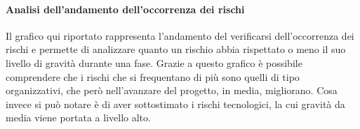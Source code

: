 \paragraph{Analisi dell'andamento dell'occorrenza dei rischi}
Il grafico qui riportato rappresenta l'andamento del verificarsi dell'occorrenza dei rischi e permette di analizzare quanto un rischio abbia rispettato o meno il suo livello di gravità durante una fase.
Grazie a questo grafico è possibile comprendere che i rischi che si frequentano di più sono quelli di tipo organizzativi, che però nell'avanzare del progetto, in media, migliorano.
Cosa invece si può notare è di aver sottostimato i rischi tecnologici, la cui gravità da media viene portata a livello alto.